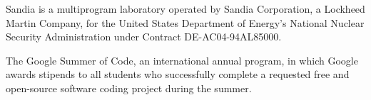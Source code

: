 Sandia is a multiprogram laboratory operated by Sandia Corporation, a Lockheed Martin Company, for the United States Department of Energy's National Nuclear Security Administration under Contract DE-AC04-94AL85000.

The Google Summer of Code, an international annual program, in which Google awards stipends to all students who successfully complete a requested free and open-source software coding project during the summer. 